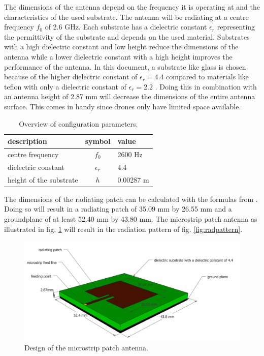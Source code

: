 \documentclass[twocolumn]{phdsymp} %
\begin{document}
The dimensions of the antenna depend on the frequency it is operating at and the characteristics of the used substrate.
The antenna will be radiating at a centre frequency $f_0$ of 2.6 GHz. Each substrate has a dielectric constant $\epsilon_r$ representing 
the permittivity of the substrate and depends on the used material.
Substrates with a high dielectric constant and low height 
reduce the dimensions of the antenna
while a lower dielectric constant with a high height improves the performance of the antenna. 
In this document, a substrate like glass 
is chosen because of the higher dielectric constant of $\epsilon_r = 4.4$ compared to materials like teflon with only a dielectric 
constant of $\epsilon_r = 2.2$ \cite{J14_antennadesign}. 
Doing this in combination with an antenna height of 2.87 mm will decrease the dimensions of the entire antenna surface.
This comes in handy since drones only have limited space available.

\begin{table}[h!]
\centering
\begin{tabular}{|l|c|l|}
\hline
 description            & symbol          & value         \\    \hline
 centre frequency       & $f_0$           & 2600 Hz       \\ 
 dielectric constant    & $\epsilon_r$    & 4.4         \\ 
 height of the substrate & $h$             & 0.00287 m    \\ \hline
\end{tabular}
\caption{Overview of configuration parameters.}
\label{table:antennaparas}
\end{table}

The dimensions of the radiating patch can be calculated with the formulas from \cite{J14_antennadesign, J15_antennadesign}.
Doing so will result in a radiating patch of 35.09 mm by 26.55 mm and a groundplane of at least 52.40 mm by 43.80 mm.
The microstrip patch antenna as illustrated in fig. \ref{fig:basicpatchantenna} will result in the radiation pattern of fig. \ref{fig:radpattern}.
\begin{figure}[h!]
\centering
  \includegraphics[width=\linewidth]{MicrostripAntenna.png}
  \caption{Design of the microstrip patch antenna.}
  \label{fig:basicpatchantenna}
\end{figure}
\end{document}
